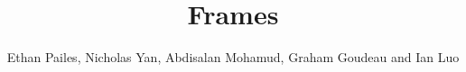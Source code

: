 \documentclass[final]{beamer}
\title{Frames} %
\author{Ethan Pailes, Nicholas Yan, Abdisalan Mohamud, Graham Goudeau and Ian Luo} %
\institute{Tufts University} %
\newlength{\sepwid}
\newlength{\onecolwid}
\begin{document}

\setlength{\belowcaptionskip}{2ex} %
\setlength\belowdisplayshortskip{2ex} %

\begin{frame}[t] %

\begin{columns}[t] %

\begin{column}{\sepwid}\end{column} %

\begin{column}{\onecolwid} %





\setlength{\parindent}{4em}
\setlength{\parskip}{1em}


\end{column}
\end{columns}
\end{frame}
\end{document}
